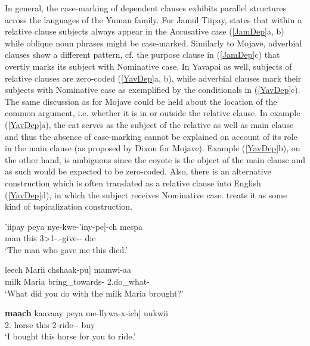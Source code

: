 In general, the case-marking of dependent clauses exhibits parallel structures across the languages of the Yuman family.
For {Jamul Tiipay}, \citet[210]{Miller:2001} states that within a relative clause subjects always appear in the Accusative case (\ref{JamDep}a, b) while oblique noun phrases might be case-marked. 
Similarly to Mojave, adverbial clauses show a different pattern, cf. the purpose clause in (\ref{JamDep}c) that overtly marks its subject with Nominative  case.
In Yavapai as well, subjects of  relative clauses are zero-coded (\ref{YavDep}a, b), while adverbial clauses mark their subjects with Nominative  case as exemplified by the conditionals in (\ref{YavDep}c). 
The same discussion as for Mojave could be held about the location of the common argument, i.e. whether it is in or outside the relative clause. 
In example (\ref{YavDep}a), the cat serves as the subject of the relative as well as main clause and thus the absence of case-marking cannot be explained on account of its role in the main clause (as proposed by Dixon for Mojave). 
Example (\ref{YavDep}b), on the other hand, is ambiguous since the coyote is the object of the main clause and as such would be expected to be zero-coded. 
Also, there is an alternative construction which is often translated as a relative clause into English (\ref{YavDep}d), in which the subject receives Nominative  case. \citet[221]{Kendall:1976} treats it as some kind of topicalization construction.

\begin{exe}\ex\label{JamDep}
\begin{xlist}
\ex\gll  {\rm[}'iipay peya nye-kwe-'iny-pe{\rm]}-ch mespa\\
man this 3\textgreater 1-\sbj{}.\relativ{}-give-\dem{}-\nom{} die\\
\glt `The man who gave me this died.'

\ex\gll  {\rm[}leech Marii chshaak-pu{\rm]} mamwi-aa\\
milk Maria bring\_towards-\dem{} 2.do\_what-\question{}\\
\glt `What did you do with the milk Maria brought?'


\ex\gll  {\rm[}\textbf{maach} kaavaay peya me-llywa-x-ich{\rm]} uukwii\\
2\sg{}.\nom{} horse this 2-ride-\irr{}-\purp{} buy\\
\glt `I bought this horse for you to ride.' %

\end{xlist}
\end{exe}


